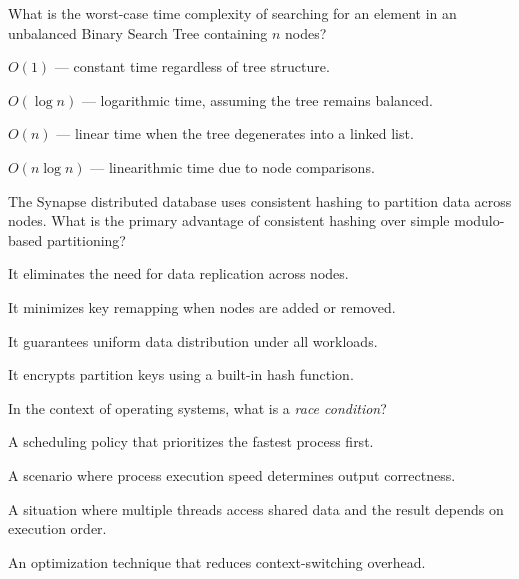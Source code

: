 \documentclass[11pt,a4paper]{article}
\begin{document}
\begin{questionblock}
 What is the worst-case time complexity of searching for an element in an unbalanced Binary Search Tree containing $n$ nodes?
\begin{mcoptions}
  \item[\textbf{A.}] $O(1)$ --- constant time regardless of tree structure.
  \item[\textbf{B.}] $O(\log n)$ --- logarithmic time, assuming the tree remains balanced.
  \item[\textbf{C.}] $O(n)$ --- linear time when the tree degenerates into a linked list.
  \item[\textbf{D.}] $O(n \log n)$ --- linearithmic time due to node comparisons.
\end{mcoptions}
\end{questionblock}

\begin{questionblock}
 The Synapse distributed database uses consistent hashing to partition data across nodes. What is the primary advantage of consistent hashing over simple modulo-based partitioning?
\begin{mcoptions}
  \item[\textbf{A.}] It eliminates the need for data replication across nodes.
  \item[\textbf{B.}] It minimizes key remapping when nodes are added or removed.
  \item[\textbf{C.}] It guarantees uniform data distribution under all workloads.
  \item[\textbf{D.}] It encrypts partition keys using a built-in hash function.
\end{mcoptions}
\end{questionblock}

\begin{questionblock}
 In the context of operating systems, what is a \emph{race condition}?
\begin{mcoptions}
  \item[\textbf{A.}] A scheduling policy that prioritizes the fastest process first.
  \item[\textbf{B.}] A scenario where process execution speed determines output correctness.
  \item[\textbf{C.}] A situation where multiple threads access shared data and the result depends on execution order.
  \item[\textbf{D.}] An optimization technique that reduces context-switching overhead.
\end{mcoptions}
\end{questionblock}
\end{document}

